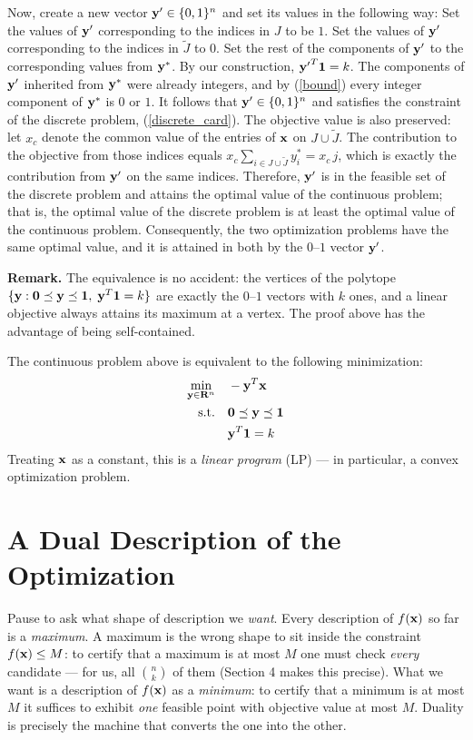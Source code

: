 \documentclass[12pt]{article}
\begin{document}
Now, create a new 
vector ${\bf y}^\prime \in \{0,1\}^n$ and set its values in the following way: 
Set the values of ${\bf y}^\prime$ corresponding to the indices in $J$
to be $1$. Set the values of ${\bf y}^\prime$ corresponding to the indices in ${\tilde J}$
to $0$. Set the rest of the components of ${\bf y}^\prime$ to the
corresponding values from ${\bf y}^*$. By our construction,
${{\bf y}^\prime}^T {\bf 1} = k$. The components of ${\bf y}^\prime$ inherited from ${\bf y}^*$
were already integers, and by (\ref{bound}) every integer component of ${\bf y}^*$
is $0$ or $1$. It follows that ${\bf y}^\prime \in \{0,1\}^n$ and
satisfies the constraint of the discrete problem, (\ref{discrete_card}).
The objective value is also preserved: let $x_c$ denote the common value of
the entries of ${\bf x}$ on $J \cup {\tilde J}$. The contribution to the objective from those indices
equals $x_c \sum_{i \in J \cup {\tilde J}} y^*_i = x_c \, j$, which is exactly the
contribution from ${\bf y}^\prime$ on the same indices.
Therefore, ${\bf y}^\prime$ is in the feasible set of the discrete problem and
attains the optimal value of the continuous problem; that is, the
optimal value of the discrete problem is at least the optimal value of the
continuous problem. Consequently, the two optimization problems have the same
optimal value, and it is attained in both by the $0$--$1$ vector ${\bf y}^\prime$.

\textbf{Remark.} The equivalence is no accident: the vertices of the polytope
$\{ {\bf y} : {\bf 0} \preceq {\bf y} \preceq {\bf 1},\; {\bf y}^T {\bf 1} = k \}$
are exactly the $0$--$1$ vectors with $k$ ones, and a linear objective always
attains its maximum at a vertex.  The proof above has the advantage of being
self-contained.

The continuous problem above is equivalent to the following minimization:
\begin{align}
	\min_{{\bf y} \in {\bf R}^n} \quad & -{\bf y}^T {\bf x} \label{op1} \\
	\text{s.t.} \quad & {\bf 0} \preceq {\bf y} \preceq {\bf 1} \label{op2} \\
	& {\bf y}^T {\bf 1} = k \label{op3}
\end{align}
Treating ${\bf x}$ as a constant, this is a {\it linear program\/} (LP) --- in particular, a convex optimization problem.

\section{A Dual Description of the Optimization}
Pause to ask what shape of description we {\it want\/}.  Every
description of $f({\bf x})$ so far is a {\it maximum\/}.  A maximum is
the wrong shape to sit inside the constraint $f({\bf x}) \le M$: to
certify that a maximum is at most $M$ one must check {\it every\/}
candidate --- for us, all $\binom{n}{k}$ of them (Section 4 makes
this precise).  What we want is a description of $f({\bf x})$ as a
{\it minimum\/}: to certify that a minimum is at most $M$ it suffices to
exhibit {\it one\/} feasible point with objective value at most $M$.
Duality is precisely the machine that converts the one into the other.
\end{document}
